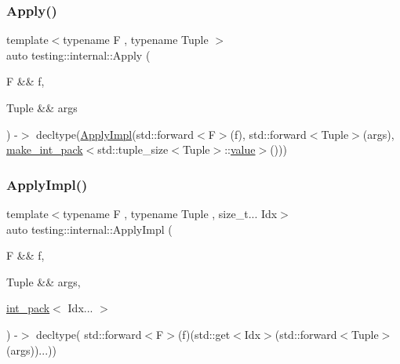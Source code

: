 \mbox{\label{namespacetesting_1_1internal_aa4d652d33ef1ce203c40ebe2d3ca6b1b}} 
\subsubsection{\texorpdfstring{Apply()}{Apply()}}
{\footnotesize\ttfamily template$<$typename F , typename Tuple $>$ \\
auto testing\+::internal\+::\+Apply (\begin{DoxyParamCaption}\item[{F \&\&}]{f,  }\item[{Tuple \&\&}]{args }\end{DoxyParamCaption}) -\/$>$ decltype(\mbox{\hyperlink{namespacetesting_1_1internal_a3a3b201170370a28f0acaf0de785cded}{Apply\+Impl}}(std\+::forward$<$F$>$(f), std\+::forward$<$Tuple$>$(args),
                          \mbox{\hyperlink{structtesting_1_1internal_1_1make__int__pack}{make\+\_\+int\+\_\+pack}}$<$std\+::tuple\+\_\+size$<$Tuple$>$\+::\mbox{\hyperlink{_obj__test_2lib_2googletest-master_2googlemock_2test_2gmock-matchers__test_8cc_a337b8a670efc0b086ad3af163f3121b6}{value}}$>$())) }

\mbox{\label{namespacetesting_1_1internal_a3a3b201170370a28f0acaf0de785cded}} 
\subsubsection{\texorpdfstring{ApplyImpl()}{ApplyImpl()}}
{\footnotesize\ttfamily template$<$typename F , typename Tuple , size\+\_\+t... Idx$>$ \\
auto testing\+::internal\+::\+Apply\+Impl (\begin{DoxyParamCaption}\item[{F \&\&}]{f,  }\item[{Tuple \&\&}]{args,  }\item[{\mbox{\hyperlink{structtesting_1_1internal_1_1int__pack}{int\+\_\+pack}}$<$ Idx... $>$}]{ }\end{DoxyParamCaption}) -\/$>$ decltype(
    std\+::forward$<$F$>$(f)(std\+::get$<$Idx$>$(std\+::forward$<$Tuple$>$(args))...)) }

